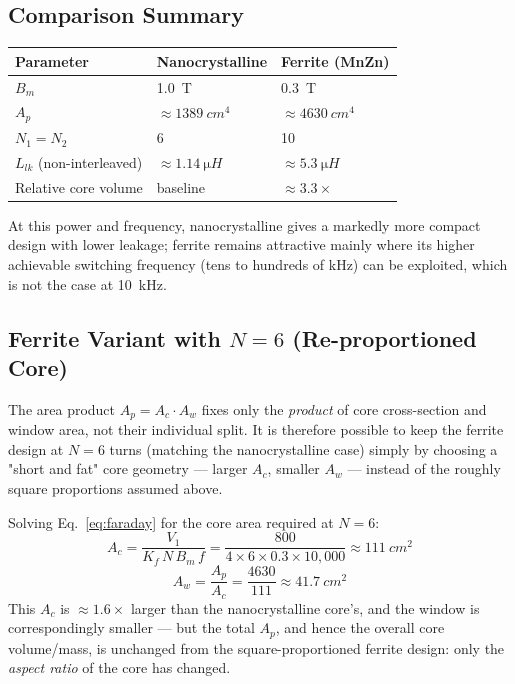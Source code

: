 \documentclass[11pt,a4paper]{article}
\begin{document}
\subsection*{Comparison Summary}
\begin{center}
\begin{tabular}{@{}lll@{}}
\toprule
Parameter & Nanocrystalline & Ferrite (MnZn) \\
\midrule
$B_m$ & \SI{1.0}{T} & \SI{0.3}{T} \\
$A_p$ & $\approx\SI{1389}{cm^4}$ & $\approx\SI{4630}{cm^4}$ \\
$N_1=N_2$ & 6 & 10 \\
$L_{lk}$ (non-interleaved) & $\approx\SI{1.14}{\micro H}$ & $\approx\SI{5.3}{\micro H}$ \\
Relative core volume & baseline & $\approx 3.3\times$ \\
\bottomrule
\end{tabular}
\end{center}
At this power and frequency, nanocrystalline gives a markedly more compact
design with lower leakage; ferrite remains attractive mainly where its higher
achievable switching frequency (tens to hundreds of kHz) can be exploited, which
is not the case at \SI{10}{kHz}.

\subsection*{Ferrite Variant with $N=6$ (Re-proportioned Core)}
The area product $A_p=A_c \cdot A_w$ fixes only the \emph{product} of core
cross-section and window area, not their individual split. It is therefore
possible to keep the ferrite design at $N=6$ turns (matching the nanocrystalline
case) simply by choosing a "short and fat" core geometry — larger $A_c$, smaller
$A_w$ — instead of the roughly square proportions assumed above.

Solving Eq.~\eqref{eq:faraday} for the core area required at $N=6$:
\begin{equation}
    A_c = \frac{V_1}{K_f \, N \, B_m \, f}
    = \frac{800}{4\times6\times0.3\times10{,}000} \approx \SI{111}{cm^2}
\end{equation}
\begin{equation}
    A_w = \frac{A_p}{A_c} = \frac{4630}{111} \approx \SI{41.7}{cm^2}
\end{equation}
This $A_c$ is $\approx 1.6\times$ larger than the nanocrystalline core's, and the
window is correspondingly smaller — but the total $A_p$, and hence the overall
core volume/mass, is unchanged from the square-proportioned ferrite design: only
the \emph{aspect ratio} of the core has changed.
\end{document}
